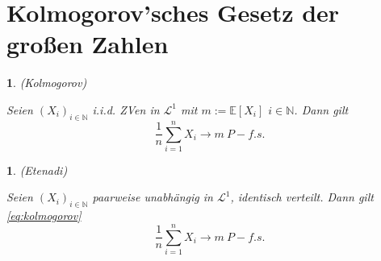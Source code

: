 \documentclass[10pt,a4paper]{report}
\numberwithin{equation}{section}
\numberwithin{figure}{section}
\theoremstyle{plain}
\theoremstyle{definition}
\theoremstyle{remark}
\theoremstyle{plain}
\newtheorem{prop}[thm]{\protect\propositionname}
\providecommand{\propositionname}{Satz}
\newcommand{\1}{ \mathbb{1} } %
\begin{document}
\section{Kolmogorov'sches Gesetz der großen Zahlen}
\begin{prop}
(Kolmogorov)

Seien $\left(X_{i}\right)_{i\in\mathbb{N}}$ i.i.d. ZVen in $\mathcal{L}^{1}$
mit $m:=\mathbb{E}\left[X_{i}\right]$ $i\in\mathbb{N}$. Dann gilt
\begin{equation}
\frac{1}{n}\sum_{i=1}^{n}X_{i}\to m\ P-f.s.\label{eq:kolmogorov}
\end{equation}

\end{prop}

\begin{prop}
(Etenadi)

Seien $\left(X_{i}\right)_{i\in\mathbb{N}}$ \emph{paarweise }unabhängig
in $\mathcal{L}^{1}$, identisch verteilt. Dann gilt \ref{eq:kolmogorov}
\[
\frac{1}{n}\sum_{i=1}^{n}X_{i}\to m\ P-f.s.
\]
\end{prop}
\end{document}
